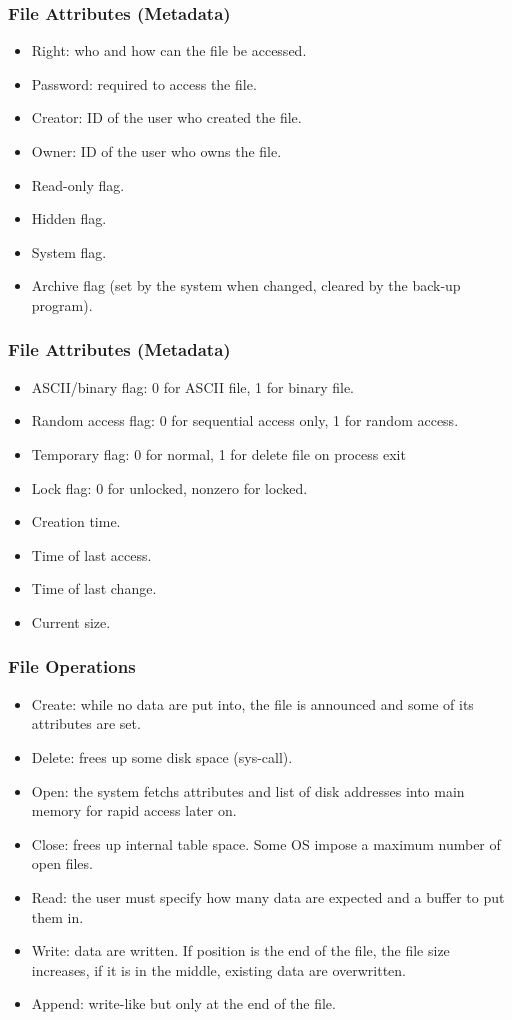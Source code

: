 \begin{frame}
    \frametitle{File Attributes (Metadata)}
    \begin{itemize}
      \item Right: who and how can the file be accessed.
      \item Password: required to access the file.
      \item Creator: ID of the user who created the file.
      \item Owner: ID of the user who owns the file.
      \item Read-only flag.
      \item Hidden flag.
      \item System flag.
      \item Archive flag (set by the system when changed, cleared by the back-up program).
    \end{itemize}
\end{frame}

\begin{frame}
    \frametitle{File Attributes (Metadata)}
    \begin{itemize}
      \item ASCII/binary flag: 0 for ASCII file, 1 for binary file.
      \item Random access flag: 0 for sequential access only, 1 for random access.
      \item Temporary flag: 0 for normal, 1 for delete file on process exit
      \item Lock flag: 0 for unlocked, nonzero for locked.
      \item Creation time.
      \item Time of last access.
      \item Time of last change.
      \item Current size.
\end{itemize}
\end{frame}

\begin{frame}
  \frametitle{File Operations}
    \begin{itemize}
      \item Create: while no data are put into, the file is announced and some of its attributes are set.
      \item Delete: frees up some disk space (sys-call).
      \item Open: the system fetchs attributes and list of disk addresses into main memory for rapid access later on.
      \item Close: frees up internal table space. Some OS impose a maximum number of open files.
      \item Read: the user must specify how many data are expected and a buffer to put them in.
      \item Write: data are written. If position is the end of the file, the file size increases, if it is in the middle, existing data are overwritten.
      \item Append: write-like but only at the end of the file.
    \end{itemize}
\end{frame}


